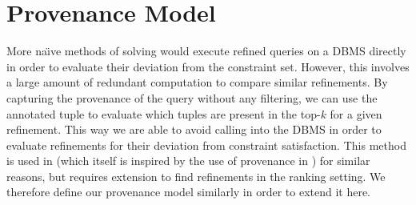 \section{Provenance Model}
\label{sec:provenance}

More na\"{\i}ve methods of solving \problem{} would execute refined queries on a DBMS directly in order to evaluate their deviation from the constraint set. However, this involves a large amount of redundant computation to compare similar refinements. By capturing the provenance of the query without any filtering, we can use the annotated tuple to evaluate which tuples are present in the top-$k$ for a given refinement. This way we are able to avoid calling into the DBMS in order to evaluate refinements for their deviation from constraint satisfaction. This method is used in \cite{MLJ22} (which itself is inspired by the use of provenance in \cite{DIMT13}) for similar reasons, but requires extension to find refinements in the ranking setting. We therefore define our provenance model similarly in order to extend it here. \\



